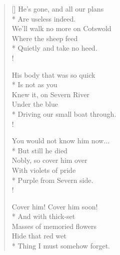 \documentclass[MAIN]{subfiles}
\begin{document}
\settowidth{\versewidth}{We'll walk no more on Cotswold}
\begin{verse}[\versewidth]
He's gone, and all our plans\\*
\vin Are useless indeed.\\
We'll walk no more on Cotswold\\
\vin Where the sheep feed\\*
\vin Quietly and take no heed.\\!

His body that was so quick\\*
\vin Is not as you\\
Knew it, on {\sc Severn River}\\
\vin Under the blue\\*
\vin Driving our small boat through.\\!

You would not know him now...\\*
\vin But still he died\\
Nobly, so cover him over\\
\vin With violets of pride\\*
\vin Purple from {\sc Severn} side.\\!

Cover him! Cover him soon!\\*
\vin And with thick-set\\
Masses of memoried flowers\\
\vin Hide that red wet\\*
\vin Thing I must somehow forget.
\end{verse}
\end{document}
